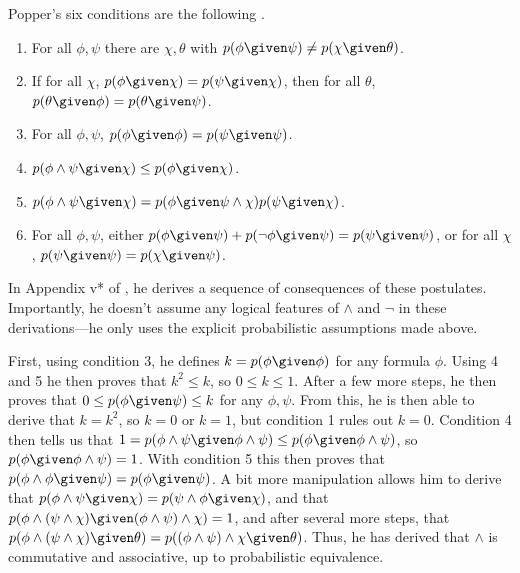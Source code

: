 Popper's six conditions are the following \citep[Appendix iv*]{popperlosd}.
\begin{enumerate}
\item For all $\phi,\psi$ there are $\chi,\theta$ with $p(\phi \given \psi)\neq p(\chi \given \theta)$.
\item If for all $\chi$, $p(\phi \given \chi)=p(\psi \given \chi)$, then for all $\theta$, $p(\theta \given \phi)=p(\theta \given \psi)$.
\item For all $\phi,\psi$, $p(\phi \given \phi)=p(\psi \given \psi)$.
\item $p(\phi\land \psi \given \chi)\leq p(\phi \given \chi)$.
\item $p(\phi\land \psi \given \chi)=p(\phi \given \psi\land \chi)p(\psi \given \chi)$.
\item For all $\phi,\psi$, either $p(\phi \given \psi)+p(\lnot \phi \given \psi)=p(\psi \given \psi)$, or for all $\chi$, $p(\psi \given \psi)=p(\chi \given \psi)$.
\end{enumerate}

In Appendix v* of \citet{popperlosd}, he derives a sequence of consequences of these postulates. Importantly, he doesn't assume any logical features of $\land$ and $\lnot$ in these derivations---he only uses the explicit probabilistic assumptions made above. 

First, using condition 3, he defines $k=p(\phi \given \phi)$ for any formula $\phi$. Using 4 and 5 he then proves that $k^2\leq k$, so $0\leq k\leq 1$. After a few more steps, he then proves that $0\leq p(\phi \given \psi)\leq k$ for any $\phi,\psi$. From this, he is then able to derive that $k=k^2$, so $k=0$ or $k=1$, but condition 1 rules out $k=0$. Condition 4 then tells us that $1=p(\phi\land \psi \given \phi\land \psi)\leq p(\phi \given \phi\land \psi)$, so $p(\phi \given \phi\land \psi)=1$. With condition 5 this then proves that $p(\phi\land \phi \given \psi)=p(\phi \given \psi)$. A bit more manipulation allows him to derive that $p(\phi\land \psi \given \chi)=p(\psi\land \phi \given \chi)$, and that $p(\phi\land(\psi\land \chi) \given (\phi\land \psi)\land \chi)=1$, and after several more steps, that $p(\phi\land(\psi\land \chi) \given \theta)=p((\phi\land \psi)\land \chi \given \theta)$. Thus, he has derived that $\land$ is commutative and associative, up to probabilistic equivalence.

